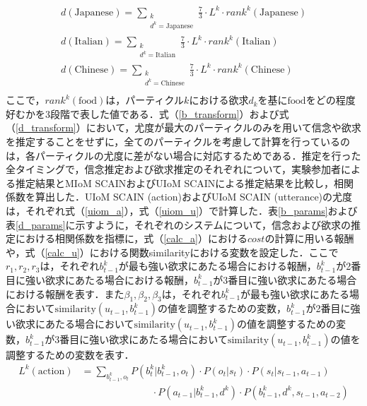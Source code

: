 \begin{equation}
  \begin{split}
  \label{d_transform}
  d(\mathrm{Japanese})= \sum_{\substack{k\\d^k=\mathrm{Japanese}}} \frac{7}{3}\cdot L^k \cdot rank^k({\mathrm{Japanese}})\\
  d(\mathrm{Italian})= \sum_{\substack{k\\d^k=\mathrm{Italian}}} \frac{7}{3}\cdot L^k \cdot rank^k({\mathrm{Italian}})\\
  d(\mathrm{Chinese})= \sum_{\substack{k\\d^k=\mathrm{Chinese}}} \frac{7}{3}\cdot L^k \cdot rank^k({\mathrm{Chinese}})\\
  \end{split}
\end{equation}
ここで，$rank^k(\mathrm{food})$は，パーティクル$k$における欲求$d_k$を基に$\mathrm{food}$をどの程度好むかを3段階で表した値である．式（\ref{b_transform}）および式（\ref{d_transform}）において，尤度が最大のパーティクルのみを用いて信念や欲求を推定することをせずに，全てのパーティクルを考慮して計算を行っているのは，各パーティクルの尤度に差がない場合に対応するためである．推定を行った全タイミングで，信念推定および欲求推定のそれぞれについて，実験参加者による推定結果とMIoM SCAINおよびUIoM SCAINによる推定結果を比較し，相関係数を算出した．UIoM SCAIN (action)およびUIoM SCAIN (utterance)の尤度は，それぞれ式（\ref{uiom_a}），式（\ref{uiom_u}）で計算した．表\ref{b_params}および表\ref{d_params}に示すように，それぞれのシステムについて，信念および欲求の推定における相関係数を指標に，式（\ref{calc_a}）における$cost$の計算に用いる報酬や，式（\ref{calc_u}）における関数similarityにおける変数を設定した．ここで$r_1,r_2,r_3$は，それぞれ$b_{t-1}^k$が最も強い欲求にあたる場合における報酬，$b_{t-1}^k$が2番目に強い欲求にあたる場合における報酬，$b_{t-1}^k$が3番目に強い欲求にあたる場合における報酬を表す．また$\beta_1,\beta_2,\beta_3$は，それぞれ$b_{t-1}^k$が最も強い欲求にあたる場合において$\mathrm{similarity}(u_{t-1},b_{t-1}^k)$の値を調整するための変数，$b_{t-1}^k$が2番目に強い欲求にあたる場合において$\mathrm{similarity}(u_{t-1},b_{t-1}^k)$の値を調整するための変数，$b_{t-1}^k$が3番目に強い欲求にあたる場合において$\mathrm{similarity}(u_{t-1},b_{t-1}^k)$の値を調整するための変数を表す．
\begin{equation}
  \begin{split}
  \label{uiom_a}
  L^k({\mathrm{action}})&= \sum_{b_{t-1}^k,o_t}P(b_t^k|b_{t-1}^k,o_t)\cdot P(o_t|s_t)\cdot P(s_t|s_{t-1},a_{t-1})\\
  &\hspace{3cm}\cdot P(a_{t-1}|b_{t-1}^k,d^k)\cdot P(b_{t-1}^k,d^k,s_{t-1},a_{t-2})
  \end{split}
\end{equation}

